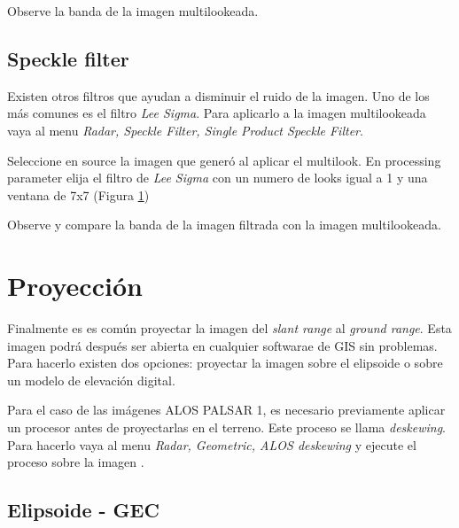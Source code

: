 \begin{que}
Observe la banda  de la imagen multilookeada.
\end{que}


\subsection{Speckle filter}

Existen otros filtros que ayudan a disminuir el ruido de la imagen. Uno de los más comunes es el filtro \emph{Lee Sigma}. Para aplicarlo a la imagen multilookeada vaya al menu \emph{Radar, Speckle Filter, Single Product Speckle Filter}.

\begin{figure}[h!]
    \centering
    \hfill
    \caption{}
    \label{fig:lee}
\end{figure}

Seleccione en source la imagen  que generó al aplicar el multilook. En processing parameter elija el filtro de \emph{Lee Sigma} con un numero de looks igual a 1 y una ventana de 7x7 (Figura \ref{fig:lee})



\begin{que}
    Observe y compare la banda  de la imagen filtrada con la imagen multilookeada.
\end{que}

\section{Proyección}

Finalmente es es común proyectar la imagen del \emph{slant range} al \emph{ground range}. Esta imagen podrá después ser abierta en cualquier softwarae de GIS sin problemas. Para hacerlo existen dos opciones: proyectar la imagen sobre el elipsoide o sobre un modelo de elevación digital.

Para el caso de las imágenes ALOS PALSAR 1, es necesario previamente aplicar un procesor antes de proyectarlas en el terreno. Este proceso se llama \emph{deskewing}. Para hacerlo vaya al menu \emph{Radar, Geometric, ALOS deskewing} y ejecute el proceso sobre la imagen .

\subsection{Elipsoide - GEC}

